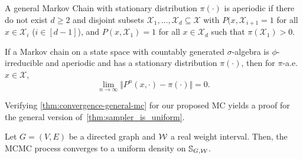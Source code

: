 \begin{definition}
  A general Markov Chain with stationary distribution $\pi({\cdot})$ is aperiodic if there do not exist $d \geq 2$ and disjoint subsets $\mathcal{X}_1,\ldots,\mathcal{X}_d \subseteq \mathcal{X}$ with $P(x, \mathcal{X}_{i + 1} = 1$ for all $x \in \mathcal{X}_i$ ($i \in [d - 1]$), and $P(x, \mathcal{X}_1) = 1$ for all $x \in \mathcal{X}_d$ such that $\pi(\mathcal{X}_1) > 0$. 
\end{definition}

\begin{theorem}
    \label{thm:convergence-general-mc}
    If a Markov chain on a state space with countably generated $\sigma$-algebra is $\phi$-irreducible and aperiodic and has a stationary distribution $\pi(\cdot)$, then for $\pi$-a.e. $x \in \mathcal X$,
    \[ \lim_{n \to \infty} \Vert P^n(x, \cdot) - \pi(\cdot) \Vert = 0. \]
\end{theorem}

Verifying \cref{thm:convergence-general-mc} for our proposed MC yields a proof for the general version of~\cref{thm:sampler_is_uniform}.

\begin{theorem}
	Let $G = (V, E)$ be a directed graph and $\mathcal W$ a real weight interval.
	Then, the MCMC process converges to a uniform density on $\mathbb{S}_{G, \mathcal W}$.\label{thm:general-uniform}
\end{theorem}

